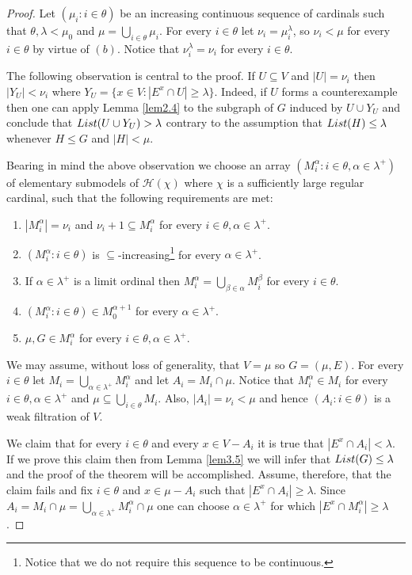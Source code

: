 \documentclass[11pt]{amsart}
\theoremstyle{definition}
\theoremstyle{remark}
\begin{document}
\begin{proof}
Let $(\mu_i:i\in\theta)$ be an increasing continuous sequence of cardinals such that $\theta,\lambda<\mu_0$ and $\mu=\bigcup_{i\in\theta}\mu_i$.
For every $i\in\theta$ let $\nu_i=\mu_i^\lambda$, so $\nu_i<\mu$ for every $i\in\theta$ by virtue of $(b)$. Notice that $\nu_i^\lambda=\nu_i$ for every $i\in\theta$.

The following observation is central to the proof.
If $U\subseteq V$ and $|U|=\nu_i$ then $|Y_U|<\nu_i$ where $Y_U=\{x\in V:|E^x\cap U|\geq\lambda\}$.
Indeed, if $U$ forms a counterexample then one can apply Lemma \ref{lem2.4} to the subgraph of $G$ induced by $U\cup Y_U$ and conclude that ${\rm List}(U\cup Y_U)>\lambda$ contrary to the assumption that ${\rm List}(H)\leq\lambda$ whenever $H\leq G$ and $|H|<\mu$.

Bearing in mind the above observation we choose an array $(M^\alpha_i:i\in\theta,\alpha\in\lambda^+)$ of elementary submodels of $\mathcal{H}(\chi)$ where $\chi$ is a sufficiently large regular cardinal, such that the following requirements are met:
\begin{enumerate}
\item [$(\alpha)$] $|M^\alpha_i|=\nu_i$ and $\nu_i+1\subseteq M^\alpha_i$ for every $i\in\theta,\alpha\in\lambda^+$.
\item [$(\beta)$] $(M^\alpha_i:i\in\theta)$ is $\subseteq$-increasing\footnote{Notice that we do not require this sequence to be continuous.} for every $\alpha\in\lambda^+$.
\item [$(\gamma)$] If $\alpha\in\lambda^+$ is a limit ordinal then $M^\alpha_i=\bigcup_{\beta\in\alpha}M^\beta_i$ for every $i\in\theta$.
\item [$(\delta)$] $(M^\alpha_i:i\in\theta)\in M^{\alpha+1}_0$ for every $\alpha\in\lambda^+$.
\item [$(\varepsilon)$] $\mu,G\in M^\alpha_i$ for every $i\in\theta,\alpha\in\lambda^+$.
\end{enumerate}
We may assume, without loss of generality, that $V=\mu$ so $G=(\mu,E)$.
For every $i\in\theta$ let $M_i=\bigcup_{\alpha\in\lambda^+}M^\alpha_i$ and let $A_i=M_i\cap\mu$.
Notice that $M^\alpha_i\in M_i$ for every $i\in\theta,\alpha\in\lambda^+$ and $\mu\subseteq\bigcup_{i\in\theta}M_i$.
Also, $|A_i|=\nu_i<\mu$ and hence $(A_i:i\in\theta)$ is a weak filtration of $V$.

We claim that for every $i\in\theta$ and every $x\in V-A_i$ it is true that $|E^x\cap A_i|<\lambda$.
If we prove this claim then from Lemma \ref{lem3.5} we will infer that ${\rm List}(G)\leq\lambda$ and the proof of the theorem will be accomplished.
Assume, therefore, that the claim fails and fix $i\in\theta$ and $x\in\mu-A_i$ such that $|E^x\cap A_i|\geq\lambda$.
Since $A_i=M_i\cap\mu=\bigcup_{\alpha\in\lambda^+}M^\alpha_i\cap\mu$ one can choose $\alpha\in\lambda^+$ for which $|E^x\cap M^\alpha_i|\geq\lambda$.


\end{proof}
\end{document}
